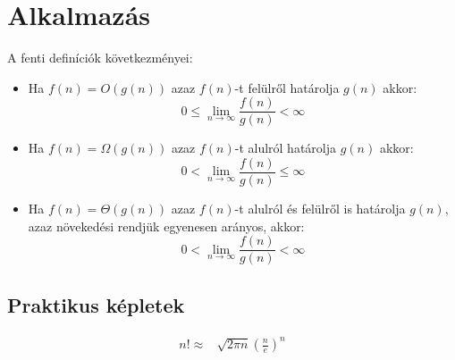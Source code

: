 \documentclass{article}
\theoremstyle{mytheoremstyle}
\theoremstyle{mytheoremstyle}
\theoremstyle{myproblemstyle}
\begin{document}

\section{Alkalmazás}
A fenti definíciók következményei:
\begin{itemize}
    \item 
    Ha $f(n) = O(g(n))$ azaz $f(n)$-t felülről határolja $g(n)$ akkor:
    \[0\leq \lim_{n\to\infty}\frac{f(n)}{g(n)}<\infty\]
    \item 
    Ha $f(n) = \Omega(g(n))$ azaz $f(n)$-t alulról határolja $g(n)$ akkor:
    \[0<\lim_{n\to\infty}\frac{f(n)}{g(n)}\leq \infty\]
    \item 
    Ha $f(n) = \Theta(g(n))$ azaz $f(n)$-t alulról és felülről is határolja $g(n)$, 
    azaz növekedési rendjük egyenesen arányos, akkor:
    \[0<\lim_{n\to\infty}\frac{f(n)}{g(n)}<\infty\]
\end{itemize}

\subsection{Praktikus képletek}
\begin{align*}
    n!\approx & \sqrt{2\pi n} { \left( \frac{n}{e} \right) }^n\\
\end{align*}
\end{document}
